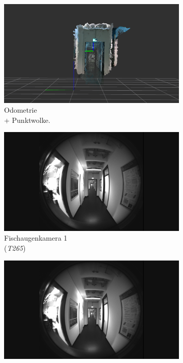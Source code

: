 \begin{figure}[h!]
	\centering
	\begin{subfigure}[b]{0.31\linewidth}
		\centering
		\includegraphics[width=\linewidth]{images/dataset/pointcloud3.png}
		\caption{Odometrie \\ + Punktwolke.}
	\end{subfigure}
	\hfill
	\begin{subfigure}[b]{0.31\linewidth}
		\centering
		\includegraphics[width=\linewidth]{images/dataset/f1_frame000005.png}
		\caption{Fischaugenkamera 1 \\(\textit{T265})}
	\end{subfigure}
	\hfill
	\begin{subfigure}[b]{0.31\linewidth}
		\centering
		\includegraphics[width=\linewidth]{images/dataset/f2_frame000005.png}

\end{subfigure}
\end{figure}
